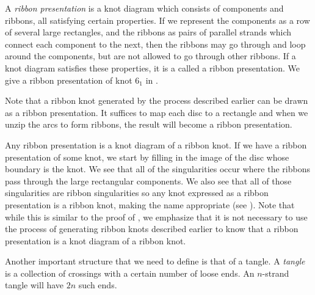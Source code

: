 \begin{paper}

A \textit{ribbon presentation} is a knot diagram which consists of components
and ribbons, all satisfying certain properties.
If we represent the components as a row of several large rectangles, and the
ribbons as pairs of parallel strands which connect each component to the next,
then the ribbons may go through and loop around the components, but are not
allowed to go through other ribbons.
If a knot diagram satisfies these properties, it is a called a ribbon
presentation.
We give a ribbon presentation of knot $6_1$ in \figPresentation.

Note that a ribbon knot generated by the process described earlier can be drawn
as a ribbon presentation.
It suffices to map each disc to a rectangle and when we unzip the arcs to form
ribbons, the result will become a ribbon presentation.

Any ribbon presentation is a knot diagram of a ribbon knot.
If we have a ribbon presentation of some knot, we start by filling in the image
of the disc whose boundary is the knot.
We see that all of the singularities occur where the ribbons pass through the
large rectangular components.
We also see that all of those singularities are ribbon singularities so any
knot expressed as a ribbon presentation is a ribbon knot, making the name
appropriate (see \figSingularities).
Note that while this is similar to the proof of \prpGeneration, we emphasize
that it is not necessary to use the process of generating ribbon knots described
earlier to know that a ribbon presentation is a knot diagram of a ribbon knot.


Another important structure that we need to define is that of a tangle.
A \textit{tangle} is a collection of crossings with a certain number of loose
ends.
An $n$-strand tangle will have $2n$ such ends.\\


\end{paper}
